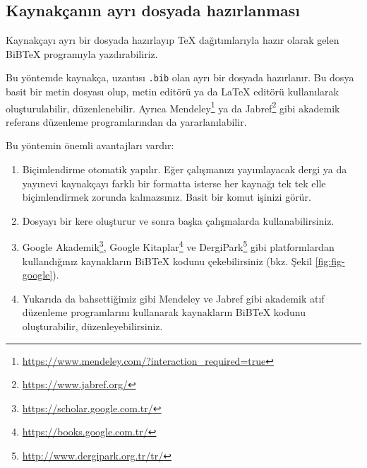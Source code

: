 \documentclass[
  10pt,
]{scrbook}
\providecommand{\tightlist}{%
  \setlength{\itemsep}{0pt}\setlength{\parskip}{0pt}}
\renewcommand{\href}[2]{#2\footnote{\url{#1}}}
\theoremstyle{definition}
\theoremstyle{definition}
\theoremstyle{definition}
\theoremstyle{definition}
\theoremstyle{remark}
\begin{document}
\hypertarget{kaynakuxe7anux131n-ayrux131-dosyada-hazux131rlanmasux131}{%
\subsection{Kaynakçanın ayrı dosyada hazırlanması}\label{kaynakuxe7anux131n-ayrux131-dosyada-hazux131rlanmasux131}}

Kaynakçayı ayrı bir dosyada hazırlayıp TeX dağıtımlarıyla hazır olarak gelen BiBTeX programıyla yazdırabiliriz.

Bu yöntemde kaynakça, uzantısı \texttt{.bib} olan ayrı bir dosyada hazırlanır. Bu dosya basit bir metin dosyası olup, metin editörü ya da LaTeX editörü kullanılarak oluşturulabilir, düzenlenebilir. Ayrıca \href{https://www.mendeley.com/?interaction_required=true}{Mendeley} ya da \href{https://www.jabref.org/}{Jabref} gibi akademik referans düzenleme programlarından da yararlanılabilir.

Bu yöntemin önemli avantajları vardır:

\begin{enumerate}
\def\labelenumi{\arabic{enumi}.}
\tightlist
\item
  Biçimlendirme otomatik yapılır. Eğer çalışmanızı yayımlayacak dergi ya da yayınevi kaynakçayı farklı bir formatta isterse her kaynağı tek tek elle biçimlendirmek zorunda kalmazsınız. Basit bir komut işinizi görür.
\item
  Dosyayı bir kere oluşturur ve sonra başka çalışmalarda kullanabilirsiniz.
\item
  \href{https://scholar.google.com.tr/}{Google Akademik}, \href{https://books.google.com.tr/}{Google Kitaplar} ve \href{http://www.dergipark.org.tr/tr/}{DergiPark} gibi platformlardan kullandığınız kaynakların BiBTeX kodunu çekebilirsiniz (bkz. Şekil \ref{fig:fig-google}).
\item
  Yukarıda da bahsettiğimiz gibi Mendeley ve Jabref gibi akademik atıf düzenleme programlarını kullanarak kaynakların BiBTeX kodunu oluşturabilir, düzenleyebilirsiniz.
\end{enumerate}
\end{document}
